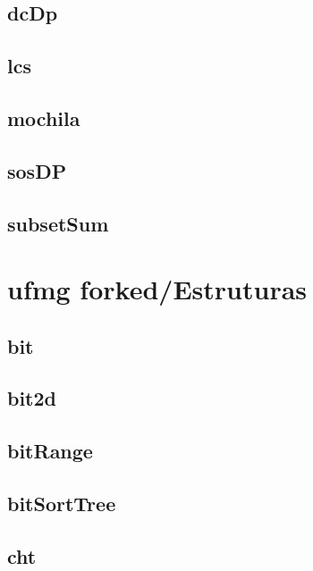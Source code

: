 \subsection{dcDp}
\raggedbottom
\hrulefill
\subsection{lcs}
\raggedbottom
\hrulefill
\subsection{mochila}
\raggedbottom
\hrulefill
\subsection{sosDP}
\raggedbottom
\hrulefill
\subsection{subsetSum}
\raggedbottom
\hrulefill

\section{ufmg forked/Estruturas}
\subsection{bit}
\raggedbottom
\hrulefill
\subsection{bit2d}
\raggedbottom
\hrulefill
\subsection{bitRange}
\raggedbottom
\hrulefill
\subsection{bitSortTree}
\raggedbottom
\hrulefill
\subsection{cht}
\raggedbottom
\hrulefill

